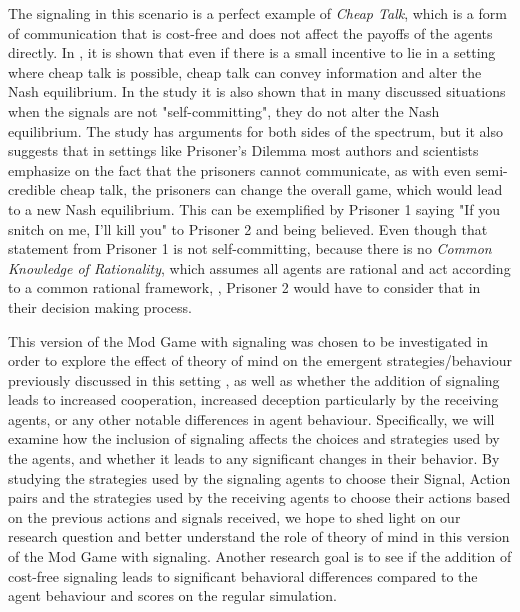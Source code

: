 The signaling in this scenario is a perfect example of \textit{Cheap Talk}, which is a form of communication that is cost-free and does not affect the payoffs of the agents directly. In \cite{farrell1996cheap}, it is shown that even if there is a small incentive to lie in a setting where cheap talk is possible, cheap talk can convey information and alter the Nash equilibrium. In the study it is also shown that in many discussed situations when the signals are not "self-committing", they do not alter the Nash equilibrium. The study has arguments for both sides of the spectrum, but it also suggests that in settings like Prisoner's Dilemma \citep{kuhn1997prisoner} most authors and scientists emphasize on the fact that the prisoners cannot communicate, as with even semi-credible cheap talk, the prisoners can change the overall game, which would lead to a new Nash equilibrium. This can be exemplified by Prisoner 1 saying "If you snitch on me, I'll kill you" to Prisoner 2 and being believed. Even though that statement from Prisoner 1 is not self-committing, because there is no \textit{Common Knowledge of Rationality}, which assumes all agents are rational and act according to a common rational framework, \citep{osborne1994course}, Prisoner 2 would have to consider that in their decision making process.

This version of the Mod Game with signaling was chosen to be investigated in order to explore the effect of theory of mind on the emergent strategies/behaviour previously discussed in this setting \citep{veltman2019training}, as well as whether the addition of signaling leads to increased cooperation, increased deception particularly by the receiving agents, or any other notable differences in agent behaviour. Specifically, we will examine how the inclusion of signaling affects the choices and strategies used by the agents, and whether it leads to any significant changes in their behavior. By studying the strategies used by the signaling agents to choose their {Signal, Action} pairs and the strategies used by the receiving agents to choose their actions based on the previous actions and signals received, we hope to shed light on our research question and better understand the role of theory of mind in this version of the Mod Game with signaling. Another research goal is to see if the addition of cost-free signaling leads to significant behavioral differences compared to the agent behaviour and scores on the regular simulation.  